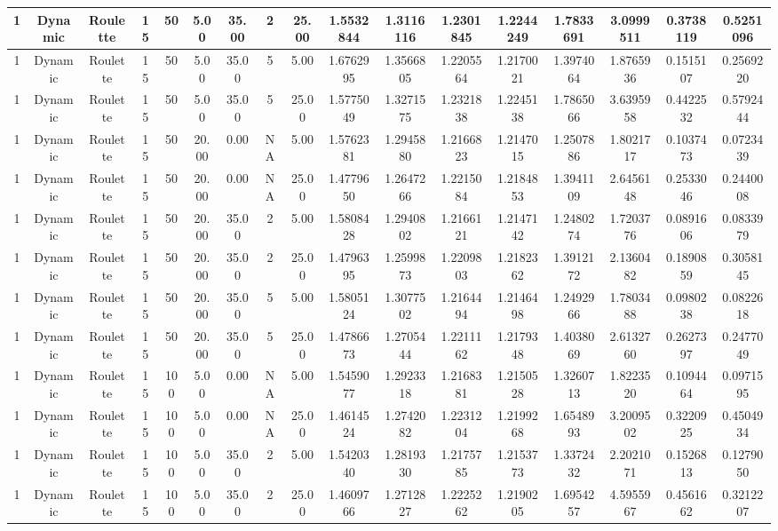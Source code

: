\documentclass[a4paper]{article}
\begin{document}
\begin{center}
\begin{tabular}{ | c | c | c | c | c | c | c | c | c | c | c | c | c | c | c | c | c | }
		\hline
		1	&	Dynamic	&	Roulette	&	15	&	50	&	5.00	&	35.00	&	2	&	25.00	&	1.5532844	&	1.3116116	&	1.2301845	&	1.2244249	&	1.7833691	&	3.0999511	&	0.3738119	&	0.5251096 \\
		\hline
		1	&	Dynamic	&	Roulette	&	15	&	50	&	5.00	&	35.00	&	5	&	5.00	&	1.6762995	&	1.3566805	&	1.2205564	&	1.2170021	&	1.3974064	&	1.8765936	&	0.1515107	&	0.2569220 \\
		\hline
		1	&	Dynamic	&	Roulette	&	15	&	50	&	5.00	&	35.00	&	5	&	25.00	&	1.5775049	&	1.3271575	&	1.2321838	&	1.2245138	&	1.7865066	&	3.6395958	&	0.4422532	&	0.5792444 \\
		\hline
		1	&	Dynamic	&	Roulette	&	15	&	50	&	20.00	&	0.00	&	NA	&	5.00	&	1.5762381	&	1.2945880	&	1.2166823	&	1.2147015	&	1.2507886	&	1.8021717	&	0.1037473	&	0.0723439 \\
		\hline
		1	&	Dynamic	&	Roulette	&	15	&	50	&	20.00	&	0.00	&	NA	&	25.00	&	1.4779650	&	1.2647266	&	1.2215084	&	1.2184853	&	1.3941109	&	2.6456148	&	0.2533046	&	0.2440008 \\
		\hline
		1	&	Dynamic	&	Roulette	&	15	&	50	&	20.00	&	35.00	&	2	&	5.00	&	1.5808428	&	1.2940802	&	1.2166121	&	1.2147142	&	1.2480274	&	1.7203776	&	0.0891606	&	0.0833979 \\
		\hline
		1	&	Dynamic	&	Roulette	&	15	&	50	&	20.00	&	35.00	&	2	&	25.00	&	1.4796395	&	1.2599873	&	1.2209803	&	1.2182362	&	1.3912172	&	2.1360482	&	0.1890859	&	0.3058145 \\
		\hline
		1	&	Dynamic	&	Roulette	&	15	&	50	&	20.00	&	35.00	&	5	&	5.00	&	1.5805124	&	1.3077502	&	1.2164494	&	1.2146498	&	1.2492966	&	1.7803488	&	0.0980238	&	0.0822618 \\
		\hline
		1	&	Dynamic	&	Roulette	&	15	&	50	&	20.00	&	35.00	&	5	&	25.00	&	1.4786673	&	1.2705444	&	1.2211162	&	1.2179348	&	1.4038069	&	2.6132760	&	0.2627397	&	0.2477049 \\
		\hline
		1	&	Dynamic	&	Roulette	&	15	&	100	&	5.00	&	0.00	&	NA	&	5.00	&	1.5459077	&	1.2923318	&	1.2168381	&	1.2150528	&	1.3260713	&	1.8223520	&	0.1094464	&	0.0971595 \\
		\hline
		1	&	Dynamic	&	Roulette	&	15	&	100	&	5.00	&	0.00	&	NA	&	25.00	&	1.4614524	&	1.2742082	&	1.2231204	&	1.2199268	&	1.6548993	&	3.2009502	&	0.3220925	&	0.4504934 \\
		\hline
		1	&	Dynamic	&	Roulette	&	15	&	100	&	5.00	&	35.00	&	2	&	5.00	&	1.5420340	&	1.2819330	&	1.2175785	&	1.2153773	&	1.3372432	&	2.2021071	&	0.1526813	&	0.1279050 \\
		\hline
		1	&	Dynamic	&	Roulette	&	15	&	100	&	5.00	&	35.00	&	2	&	25.00	&	1.4609766	&	1.2712827	&	1.2225262	&	1.2190205	&	1.6954257	&	4.5955967	&	0.4561662	&	0.3212207 \\

\end{tabular}
\end{center}
\end{document}
